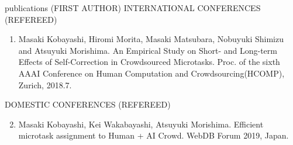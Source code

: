 \documentclass{resume} %
\begin{document}
\begin{rSection}{publications (FIRST AUTHOR)}
INTERNATIONAL CONFERENCES (REFEREED)
\begin{enumerate}
  \setcounter{enumi}{0}
  \item Masaki Kobayashi, Hiromi Morita, Masaki Matsubara, Nobuyuki Shimizu and Atsuyuki Morishima. An Empirical Study on Short- and Long-term Effects of Self-Correction in Crowdsourced Microtasks. Proc. of the sixth AAAI Conference on Human Computation and Crowdsourcing(HCOMP), Zurich, 2018.7.
\end{enumerate}

DOMESTIC CONFERENCES (REFEREED)
\begin{enumerate}
  \setcounter{enumi}{1}
  \item Masaki Kobayashi, Kei Wakabayashi, Atsuyuki Morishima. Efficient microtask assignment to Human + AI Crowd. WebDB Forum 2019, Japan.
\end{enumerate}


\end{rSection}
\end{document}
